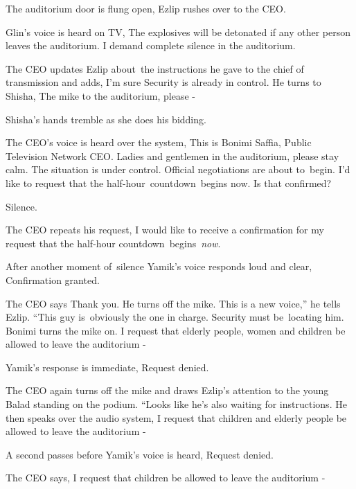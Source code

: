 \documentclass[twoside,11pt]{book}
\begin{document}
The auditorium door is flung open, Ezlip rushes over to the CEO.\ 

Glin's voice is heard on TV, {\textquotedbl}The explosives will be detonated if any other person leaves the auditorium.
I demand complete silence in the auditorium.{\textquotedbl}

The CEO updates Ezlip about~the instructions he gave to the chief of transmission and adds, {\textquotedbl}I'm sure
Security is already in control.{\textquotedbl} He turns to Shisha, {\textquotedbl}The mike to the auditorium, please
-{\textquotedbl}

Shisha's hands tremble as she does his bidding.

The CEO's voice is heard over the system, {\textquotedbl}This is Bonimi Saffia, Public Television Network CEO. Ladies
and gentlemen in the auditorium, please stay calm. The situation is under control. Official negotiations are about
to{\ }begin. I'd like to request that the
half{}-hour{\ }countdown{\ }begins now. Is that confirmed?{\textquotedbl}

Silence.

The CEO repeats his request, {\textquotedbl}I would like to receive a confirmation for my request that the half{}-hour
countdown\ begins\ \textit{now}.{\textquotedbl}

After another moment of\ silence Yamik's voice responds loud and clear, {\textquotedbl}Confirmation
granted.{\textquotedbl} 

The CEO says {\textquotedbl}Thank you.{\textquotedbl} He turns off the mike. {\textquotedbl}This is a new voice,'' he
tells Ezlip. ``This guy is{\ }obviously the one in charge. Security must
be{\ }locating him.{\textquotedbl} Bonimi turns the mike on. {\textquotedbl}I request that elderly
people, women and children be allowed to leave the auditorium -{\textquotedbl}

Yamik's response is immediate, {\textquotedbl}Request denied.{\textquotedbl}

The CEO again turns off the mike and draws Ezlip's attention to the young Balad standing on the podium. ``Looks like
he's also waiting for instructions.{\textquotedbl} He then speaks over the audio system, {\textquotedbl}I request that
children and elderly people be allowed to leave the auditorium -{\textquotedbl}

A second passes before Yamik's voice is heard, {\textquotedbl}Request denied.{\textquotedbl}

The CEO says, {\textquotedbl}I request that children be allowed to leave the auditorium -{\textquotedbl}
\end{document}
